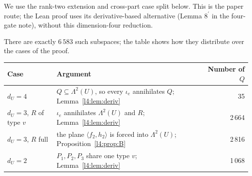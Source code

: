 \documentclass[11pt,a4paper]{article}
\theoremstyle{plain}
\theoremstyle{remark}
\newcommand{\Lam}{\Lambda^2}
\newcommand{\dU}{d_U}
\begin{document}
We use the rank-two extension and cross-part case split below. This is the paper route; the Lean proof uses its derivative-based alternative (Lemma $8^{\prime}$ in the four-gate note), without this dimension-four reduction.

There are exactly $6\,583$ such subspaces; the table shows how they distribute over the cases of the proof.

\begin{center}
\begin{tabularx}{0.95\textwidth}{@{}l X r@{}}
\toprule
Case & Argument & Number of $Q$ \\
\midrule
$\dU=4$ & $Q\subseteq\Lam(U)$, so every $\iota_e$ annihilates $Q$; Lemma~\ref{l4:lem:deriv} & 35\\
$\dU=3$, $R$ of type $v$ & $\iota_e$ annihilates $\Lam(U)$ and $R$; Lemma~\ref{l4:lem:deriv} & 2\,664\\
$\dU=3$, $R$ full & the plane $\langle f_2,h_2\rangle$ is forced into $\Lam(U)$; Proposition~\ref{l4:prop:B} & 2\,816\\
$\dU=2$ & $P_1,P_2,P_3$ share one type $v$; Lemma~\ref{l4:lem:deriv} & 1\,068\\
\bottomrule
\end{tabularx}
\end{center}
\end{document}
